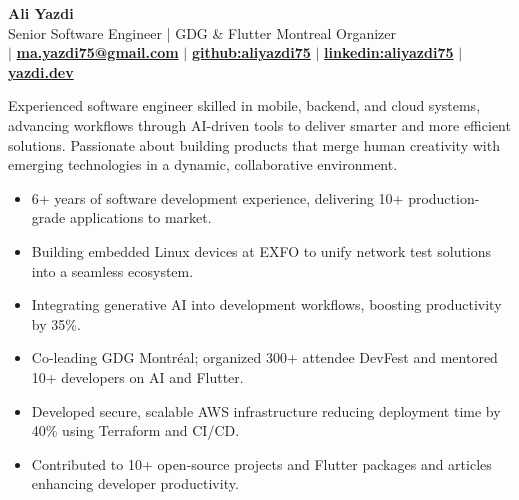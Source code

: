 \documentclass[letterpaper,11pt]{article}
\makeatletter
\newcommand{\CVAuthor}{Ali Yazdi}
\newcommand{\TitleDesciption}{Senior Software Engineer | GDG \& Flutter Montreal Organizer}
\newcommand{\CVWebpageName}{yazdi.dev}
\newcommand{\CVWebpage}{https://yazdi.dev}
\newcommand{\MainEmailName}{ma.yazdi75@gmail.com}
\newcommand{\MainEmail}{mailto:ma.yazdi75@gmail.com}
\newcommand{\LinkedinName}{linkedin:aliyazdi75}
\newcommand{\Linkedin}{https://linkedin.com/in/aliyazdi75}
\newcommand{\GithubName}{github:aliyazdi75}
\newcommand{\Github}{https://github.com/aliyazdi75}
\newcommand{\PhoneName}{}
\newcommand{\Phone}{}
\makeatother
\begin{document}

\begin{center}
      \textbf{\Huge \CVAuthor} \\
      \vspace{1mm}
      \TitleDesciption \\
      \small {\txtcolor\href{\Phone}{\textbf{\PhoneName}}}
      $\vert$
      {\txtcolor\href{\MainEmail}{\textbf{\MainEmailName}}}
      $\vert$
      {\txtcolor\href{\Github}{\textbf{\GithubName}}}
      $\vert$
      {\txtcolor\href{\Linkedin}{\textbf{\LinkedinName}}}
      $\vert$
      {\txtcolor\href{\CVWebpage}{\textbf{\CVWebpageName}}}
\end{center}



Experienced software engineer skilled in mobile, backend, and cloud systems, advancing workflows through AI-driven tools to deliver smarter and more efficient solutions.
Passionate about building products that merge human creativity with emerging technologies in a dynamic, collaborative environment.




\begin{itemize}[leftmargin=*, noitemsep, topsep=0pt, partopsep=0pt]
      \item 6+ years of software development experience, delivering 10+ production-grade applications to market.
      \item \BigGap Building embedded Linux devices at EXFO to unify network test solutions into a seamless ecosystem.
      \item \BigGap Integrating generative AI into development workflows, boosting productivity by 35\%.
      \item \BigGap Co-leading GDG Montréal; organized 300+ attendee DevFest and mentored 10+ developers on AI and Flutter.
      \item \BigGap Developed secure, scalable AWS infrastructure reducing deployment time by 40\% using Terraform and CI/CD.
      \item \BigGap Contributed to 10+ open-source projects and Flutter packages and articles enhancing developer productivity.
\end{itemize}
\end{document}
